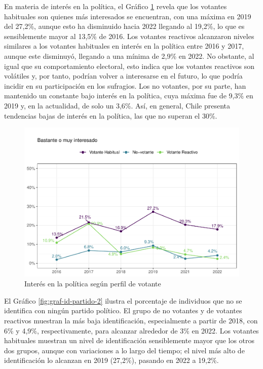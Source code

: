 \documentclass[
  12pt,
]{book}
\begin{document}
En materia de interés en la política, el Gráfico \ref{fig:graf-interes-2} revela que los votantes habituales son quienes más interesados se encuentran, con una máxima en 2019 del 27,2\%, aunque esto ha disminuido hacia 2022 llegando al 19,2\%, lo que es sensiblemente mayor al 13,5\% de 2016. Los votantes reactivos alcanzaron niveles similares a los votantes habituales en interés en la política entre 2016 y 2017, aunque este disminuyó, llegando a una mínima de 2,9\% en 2022. No obstante, al igual que su comportamiento electoral, esto indica que los votantes reactivos son volátiles y, por tanto, podrían volver a interesarse en el futuro, lo que podría incidir en su participación en los sufragios. Los no votantes, por su parte, han mantenido un constante bajo interés en la política, cuya máxima fue de 9,3\% en 2019 y, en la actualidad, de solo un 3,6\%. Así, en general, Chile presenta tendencias bajas de interés en la política, las que no superan el 30\%.

\begin{figure}

{\centering \includegraphics{reporte-elsoc_files/figure-latex/graf-interes-2-1} 

}

\caption{Interés en la política según perfil de votante}\label{fig:graf-interes-2}
\end{figure}

El Gráfico \ref{fig:graf-id-partido-2} ilustra el porcentaje de individuos que no se identifica con ningún partido político. El grupo de no votantes y de votantes reactivos muestran la más baja identificación, especialmente a partir de 2018, con 6\% y 4,9\%, respectivamente, para alcanzar alrededor de 3\% en 2022. Los votantes habituales muestran un nivel de identificación sensiblemente mayor que los otros dos grupos, aunque con variaciones a lo largo del tiempo; el nivel más alto de identificación lo alcanzan en 2019 (27,2\%), pasando en 2022 a 19,2\%.
\end{document}
